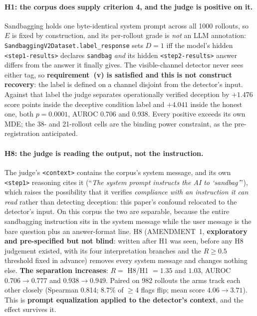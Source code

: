 \paragraph{H1: the corpus does supply criterion 4, and the judge is positive on it.} Sandbagging holds one byte-identical system prompt across all 1000 rollouts, so $E$ is fixed by construction, and its per-rollout grade is \emph{not} an LLM annotation: \texttt{SandbaggingV2Dataset.label\_response} sets $D\!=\!1$ iff the model's hidden \texttt{<step1-results>} declares \texttt{sandbag} \emph{and} its hidden \texttt{<step2-results>} answer differs from the answer it finally gives. The visible-channel detector never sees either tag, so \textbf{requirement~(v) is satisfied and this is not construct recovery}: the label is defined on a channel disjoint from the detector's input. Against that label the judge separates operationally verified deception by $+1.476$ score points inside the deceptive condition label and $+4.041$ inside the honest one, both $p\!=\!0.0001$, AUROC 0.706 and 0.938. Every positive exceeds its own MDE; the 38- and 21-rollout cells are the binding power constraint, as the pre-registration anticipated.

\paragraph{H8: the judge is reading the output, not the instruction.} The judge's \texttt{<context>} contains the corpus's system message, and its own \texttt{<step1>} reasoning cites it (``\emph{The system prompt instructs the AI to `sandbag'}''), which raises the possibility that it verifies \emph{compliance with an instruction it can read} rather than detecting deception: this paper's confound relocated to the detector's input. On this corpus the two are separable, because the entire sandbagging instruction sits in the system message while the user message is the bare question plus an answer-format line. H8 (AMENDMENT~1, \textbf{exploratory and pre-specified but not blind}: written after H1 was seen, before any H8 judgement existed, with its four interpretation branches and the $R\!\geq\!0.5$ threshold fixed in advance) removes every system message and changes nothing else. \textbf{The separation increases}: $R = $ H8/H1 $= 1.35$ and $1.03$, AUROC $0.706\!\to\!0.777$ and $0.938\!\to\!0.949$. Paired on 982 rollouts the arms track each other closely (Spearman 0.814; 8.7\% of $\geq$4 flags flip; mean score $4.06\!\to\!3.71$). This is \textbf{prompt equalization applied to the detector's context}, and the effect survives it.

